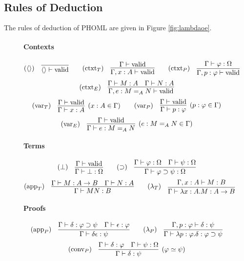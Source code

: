 \documentclass[a4paper,UKenglish]{lipics-v2016}
\newcommand*{\vald}{\ensuremath{\vdash \mathrm{valid}}}
\theoremstyle{plain}
\theoremstyle{definition}
\begin{document}
\subsection{Rules of Deduction}

The rules of deduction of PHOML are given in Figure \ref{fig:lambdaoe}.

\newcommand{\RvarT}{\ensuremath(\mathsf{varT})}
\begin{figure}
\paragraph*{Contexts}
\[ (\langle \rangle) \quad \vcenter{\infer{\langle \rangle \vald}{}} \qquad
(\mathrm{ctxt}_T) \quad \vcenter{\infer{\Gamma, x : A \vald}{\Gamma \vald}} \qquad 
(\mathrm{ctxt}_P) \quad \vcenter{\infer{\Gamma, p : \varphi \vald}{\Gamma \vdash \varphi : \Omega}} \]
\[ (\mathrm{ctxt}_E) \quad \vcenter{\infer{\Gamma, e : M =_A N \vald}{\Gamma \vdash M : A \quad \Gamma \vdash N : A}} \]
\[ (\mathrm{var}_T) \quad \vcenter{\infer[(x : A \in \Gamma)]{\Gamma \vdash x : A}{\Gamma \vald}} \qquad
(\mathrm{var}_P) \quad \vcenter{\infer[(p : \varphi \in \Gamma)]{\Gamma \vdash p : \varphi}{\Gamma \vald}} \]
\[ (\mathrm{var}_E) \quad \vcenter{\infer[(e : M =_A N \in \Gamma)]{\Gamma \vdash e : M =_A N}{\Gamma \vald}} \]

\paragraph*{Terms}
\[ (\bot) \quad \vcenter{\infer{\Gamma \vdash \bot : \Omega}{\Gamma \vald}} \qquad
(\supset) \quad \vcenter{\infer{\Gamma \vdash \varphi \supset \psi : \Omega}{\Gamma \vdash \varphi : \Omega \quad \Gamma \vdash \psi : \Omega}} \]
\[ (\mathrm{app}_T) \quad \vcenter{\infer{\Gamma \vdash M N : B} {\Gamma \vdash M : A \rightarrow B \quad \Gamma \vdash N : A}} \qquad
(\lambda_T) \quad \vcenter{\infer{\Gamma \vdash \lambda x:A.M : A \rightarrow B}{\Gamma, x : A \vdash M : B}} \]

\paragraph*{Proofs}
\[ (\mathrm{app}_P) \quad \vcenter{\infer{\Gamma \vdash \delta \epsilon : \psi} {\Gamma \vdash \delta : \varphi \supset \psi \quad \Gamma \vdash \epsilon : \varphi}} \qquad
(\lambda_P) \quad \vcenter{\infer{\Gamma \vdash \lambda p : \varphi . \delta : \varphi \supset \psi}{\Gamma, p : \varphi \vdash \delta : \psi}} \]
\[ (\mathrm{conv}_P) \quad \vcenter{\infer[(\varphi \simeq \psi)]{\Gamma \vdash \delta : \psi}{\Gamma \vdash \delta : \varphi \quad \Gamma \vdash \psi : \Omega}} \]


\end{figure}
\end{document}
